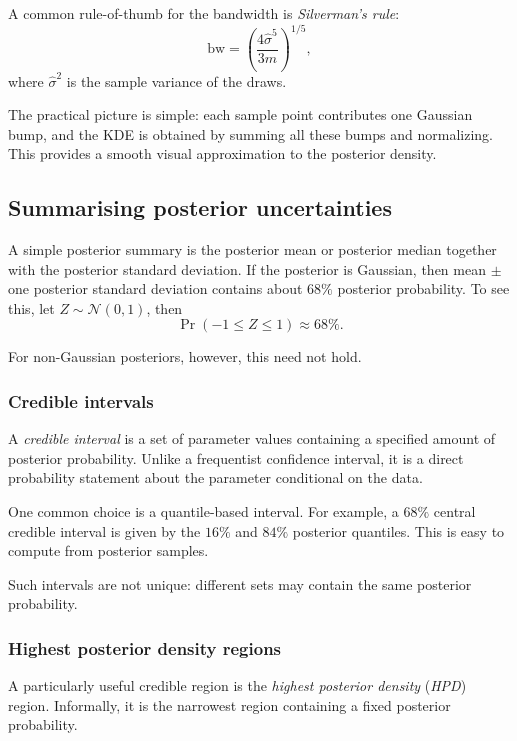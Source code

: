 \documentclass[11pt, titlepage]{article} %
\numberwithin{equation}{section}
\theoremstyle{definition}
\numberwithin{assumption}{section}
\begin{document}
A common rule-of-thumb for the bandwidth is \textit{Silverman’s rule}:
\begin{equation*}
    \mathrm{bw}
    =
    \left(\frac{4\hat\sigma^5}{3m}\right)^{1/5},
\end{equation*}
where $\hat\sigma^2$ is the sample variance of the draws.

The practical picture is simple: each sample point contributes one Gaussian bump, and the KDE is obtained by summing all these bumps and normalizing. This provides a smooth visual approximation to the posterior density.

\subsection{Summarising posterior uncertainties}

A simple posterior summary is the posterior mean or posterior median together with the posterior standard deviation. If the posterior is Gaussian, then mean $\pm$ one posterior standard deviation contains about $68\%$ posterior probability. To see this, let $Z\sim\mathcal{N}(0,1)$, then
\begin{equation*}
    \Pr(-1\le Z\le 1)\approx68\%.
\end{equation*}

For non-Gaussian posteriors, however, this need not hold.

\subsubsection*{Credible intervals}

A \textit{credible interval} is a set of parameter values containing a specified amount of posterior probability. Unlike a frequentist confidence interval, it is a direct probability statement about the parameter conditional on the data.

One common choice is a quantile-based interval. For example, a $68\%$ central credible interval is given by the $16\%$ and $84\%$ posterior quantiles. This is easy to compute from posterior samples.

Such intervals are not unique: different sets may contain the same posterior probability.

\subsubsection*{Highest posterior density regions}

A particularly useful credible region is the \textit{highest posterior density} (\textit{HPD}) region. Informally, it is the narrowest region containing a fixed posterior probability.
\end{document}
